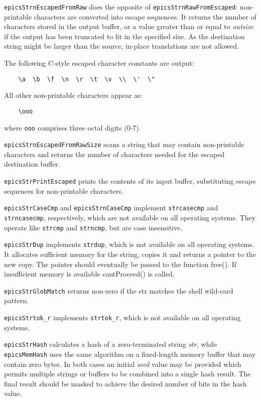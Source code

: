 \verb|epicsStrnEscapedFromRaw| does the opposite of \verb|epicsStrnRawFromEscaped|:
non-printable characters are converted into escape sequences.
It returns the number of characters stored in the output buffer, or a value greater than or equal to \emph{outsize} if the output has been truncated to fit in the specified size.
As the destination string might be larger than the source, in-place translations are not allowed.

The following C-style escaped character constants are output:

\begin{verbatim}
    \a  \b  \f  \n  \r  \t  \v  \\  \'  \"
\end{verbatim}

All other non-printable characters appear as:

\begin{verbatim}
    \ooo
\end{verbatim}

where \verb|ooo| comprises three octal digits (0-7).

\verb|epicsStrnEscapedFromRawSize| scans a string that may contain non-printable characters and returns the number of characters needed for the escaped destination buffer.

\verb|epicsStrPrintEscaped| prints the contents of its input buffer, substituting escape sequences for non-printable characters.

\verb|epicsStrCaseCmp| and \verb|epicsStrnCaseCmp| implement \verb|strcasecmp| and \verb|strncasecmp|, respectively, which are not available on all operating systems.
They operate like \verb|strcmp| and \verb|strncmp|, but are case insensitive.

\verb|epicsStrDup| implements \verb|strdup|, which is not available on all operating systems.
It allocates sufficient memory for the string, copies it and returns a pointer to the new copy.
The pointer should eventually be passed to the function free().
If insufficient memory is available cantProceed() is called.

\verb|epicsStrGlobMatch| returns non-zero if the str matches the shell wild-card pattern.

\verb|epicsStrtok_r| implements \verb|strtok_r|, which is not available on all operating systems.

\verb|epicsStrHash| calculates a hash of a zero-terminated string \emph{str}, while \verb|epicsMemHash| uses the same algorithm on a fixed-length memory buffer that may contain zero bytes.
In both cases an initial \emph{seed} value may be provided which permits multiple strings or buffers to be combined into a single hash result.
The final result should be masked to achieve the desired number of bits in the hash value.

